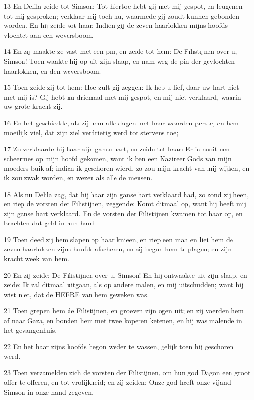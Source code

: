 \par 13 En Delila zeide tot Simson: Tot hiertoe hebt gij met mij gespot, en leugenen tot mij gesproken; verklaar mij toch nu, waarmede gij zoudt kunnen gebonden worden. En hij zeide tot haar: Indien gij de zeven haarlokken mijns hoofds vlochtet aan een weversboom.
\par 14 En zij maakte ze vast met een pin, en zeide tot hem: De Filistijnen over u, Simson! Toen waakte hij op uit zijn slaap, en nam weg de pin der gevlochten haarlokken, en den weversboom.
\par 15 Toen zeide zij tot hem: Hoe zult gij zeggen: Ik heb u lief, daar uw hart niet met mij is? Gij hebt nu driemaal met mij gespot, en mij niet verklaard, waarin uw grote kracht zij.
\par 16 En het geschiedde, als zij hem alle dagen met haar woorden perste, en hem moeilijk viel, dat zijn ziel verdrietig werd tot stervens toe;
\par 17 Zo verklaarde hij haar zijn ganse hart, en zeide tot haar: Er is nooit een scheermes op mijn hoofd gekomen, want ik ben een Nazireer Gods van mijn moeders buik af; indien ik geschoren wierd, zo zou mijn kracht van mij wijken, en ik zou zwak worden, en wezen als alle de mensen.
\par 18 Als nu Delila zag, dat hij haar zijn ganse hart verklaard had, zo zond zij heen, en riep de vorsten der Filistijnen, zeggende: Komt ditmaal op, want hij heeft mij zijn ganse hart verklaard. En de vorsten der Filistijnen kwamen tot haar op, en brachten dat geld in hun hand.
\par 19 Toen deed zij hem slapen op haar knieen, en riep een man en liet hem de zeven haarlokken zijns hoofds afscheren, en zij begon hem te plagen; en zijn kracht week van hem.
\par 20 En zij zeide: De Filistijnen over u, Simson! En hij ontwaakte uit zijn slaap, en zeide: Ik zal ditmaal uitgaan, als op andere malen, en mij uitschudden; want hij wist niet, dat de HEERE van hem geweken was.
\par 21 Toen grepen hem de Filistijnen, en groeven zijn ogen uit; en zij voerden hem af naar Gaza, en bonden hem met twee koperen ketenen, en hij was malende in het gevangenhuis.
\par 22 En het haar zijns hoofds begon weder te wassen, gelijk toen hij geschoren werd.
\par 23 Toen verzamelden zich de vorsten der Filistijnen, om hun god Dagon een groot offer te offeren, en tot vrolijkheid; en zij zeiden: Onze god heeft onze vijand Simson in onze hand gegeven.
